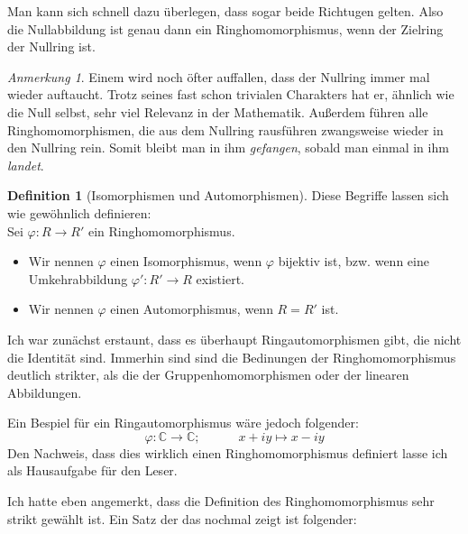 \documentclass{article}
\theoremstyle{definition}
\newtheorem*{definition}{Definition}
\theoremstyle{remark}
\newtheorem*{anm}{Anmerkung}
\begin{document}
\vspace{0.7em}
Man kann sich schnell dazu überlegen, dass sogar beide
Richtugen gelten. Also die Nullabbildung ist genau dann ein Ringhomomorphismus, wenn der Zielring der Nullring
ist.

\begin{anm}
Einem wird noch öfter auffallen, dass der Nullring immer mal wieder auftaucht. Trotz seines fast schon
trivialen Charakters hat er, ähnlich wie die Null selbst, sehr viel Relevanz in der Mathematik. Außerdem führen
alle Ringhomomorphismen, die aus dem Nullring rausführen zwangsweise wieder in den Nullring rein. Somit bleibt
man in ihm \emph{gefangen}, sobald man einmal in ihm \emph{landet}.
\end{anm}

\begin{definition}[Isomorphismen und Automorphismen] Diese Begriffe lassen sich wie gewöhnlich definieren: \\
Sei $\varphi: R\to R'$ ein Ringhomomorphismus.
\begin{itemize}
    \item Wir nennen $\varphi$ einen Isomorphismus, wenn $\varphi$ bijektiv ist, bzw. wenn eine Umkehrabbildung
    $\varphi': R'\to R$ existiert.
    \item Wir nennen $\varphi$ einen Automorphismus, wenn $R=R'$ ist.
\end{itemize}

\end{definition}

Ich war zunächst erstaunt, dass es überhaupt Ringautomorphismen gibt, die nicht die Identität sind. Immerhin
sind sind die Bedinungen der Ringhomomorphismus deutlich strikter, als die der Gruppenhomomorphismen oder der 
linearen Abbildungen.

Ein Bespiel für ein Ringautomorphismus wäre jedoch folgender:
\[\varphi: \mathbb C\to\mathbb C; \hspace{3em} x+iy \longmapsto x-iy\]
Den Nachweis, dass dies wirklich einen Ringhomomorphismus definiert lasse ich als Hausaufgabe für den Leser.

\newpage
Ich hatte eben angemerkt, dass die Definition des Ringhomomorphismus sehr strikt gewählt ist. Ein Satz der das
nochmal zeigt ist folgender:
\end{document}
